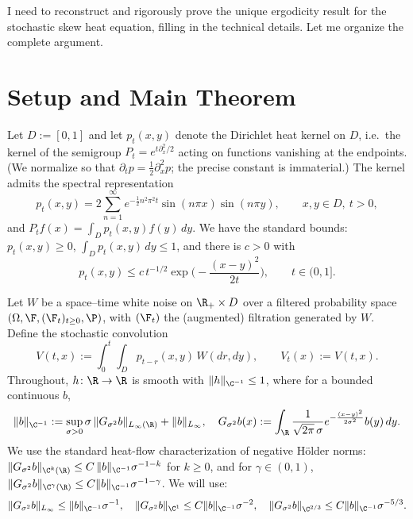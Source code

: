 I need to reconstruct and rigorously prove the unique ergodicity result for the stochastic skew heat equation, filling in the technical details. Let me organize the complete argument.

\section{Setup and Main Theorem}

\begin{definition}\label{def:setup}
Let $D:=[0,1]$ and let $p_t(x,y)$ denote the Dirichlet heat kernel on $D$, i.e.\ the kernel of the semigroup $P_t=e^{t\partial_x^2/2}$ acting on functions vanishing at the endpoints. (We normalize so that $\partial_t p=\tfrac12\partial_x^2 p$; the precise constant is immaterial.) The kernel admits the spectral representation
\[
p_t(x,y)=2\sum_{n=1}^\infty e^{-\frac12 n^2\pi^2 t}\sin(n\pi x)\sin(n\pi y),\qquad x,y\in D,\ t>0,
\]
and $P_tf(x)=\int_D p_t(x,y)f(y)\,dy$. We have the standard bounds: $p_t(x,y)\ge 0$, $\int_D p_t(x,y)\,dy\le 1$, and there is $c>0$ with
\begin{equation}\label{eq:hk-gauss}
p_t(x,y)\le c\,t^{-1/2}\exp\!\Big(-\frac{(x-y)^2}{2t}\Big),\qquad t\in(0,1].
\end{equation}
\end{definition}

Let $W$ be a space--time white noise on $\R_+\times D$ over a filtered probability space $(\Omega,\F,(\F_t)_{t\ge0},\P)$, with $(\F_t)$ the (augmented) filtration generated by $W$. Define the stochastic convolution
\[
V(t,x):=\int_0^t\int_D p_{t-r}(x,y)\,W(dr,dy),\qquad V_t(x):=V(t,x).
\]
Throughout, $h\colon\R\to\R$ is smooth with $\|h\|_{\C^{-1}}\le 1$, where for a bounded continuous $b$,
\[
\|b\|_{\C^{-1}}:=\sup_{\sigma>0}\sigma\,\|G_{\sigma^2}b\|_{L_\infty(\R)}+\|b\|_{L_\infty},
\quad
G_{\sigma^2}b(x):=\int_\R \frac{1}{\sqrt{2\pi}\,\sigma}e^{-\frac{(x-y)^2}{2\sigma^2}}b(y)\,dy.
\]
We use the standard heat-flow characterization of negative Hölder norms: $\|G_{\sigma^2}b\|_{\C^k(\R)}\le C\,\|b\|_{\C^{-1}}\sigma^{-1-k}$ for $k\ge 0$, and for $\gamma\in(0,1)$, $\|G_{\sigma^2}b\|_{\C^\gamma(\R)}\le C\|b\|_{\C^{-1}}\sigma^{-1-\gamma}$. We will use:
\begin{equation}\label{eq:gauss-bound}
\|G_{\sigma^2}b\|_{L_\infty}\le \|b\|_{\C^{-1}}\sigma^{-1},\quad
\|G_{\sigma^2}b\|_{\C^1}\le C\|b\|_{\C^{-1}}\sigma^{-2},\quad
\|G_{\sigma^2}b\|_{\C^{2/3}}\le C\|b\|_{\C^{-1}}\sigma^{-5/3}.
\end{equation}

